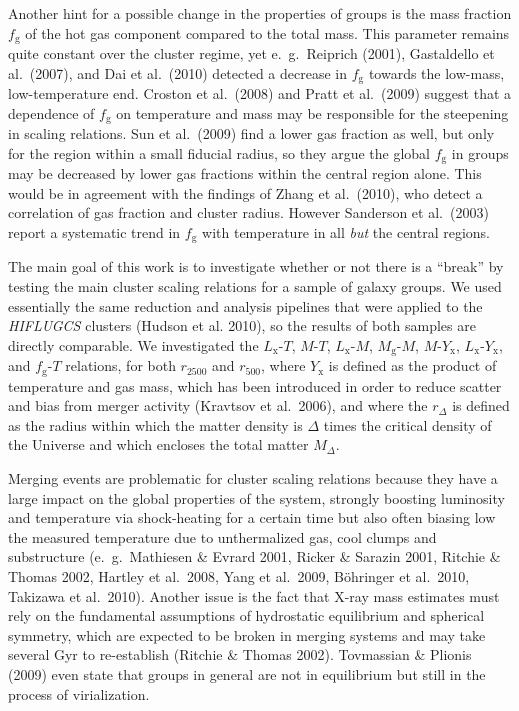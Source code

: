 \documentclass[structabstract]{aa}
\begin{document}
Another hint for a possible change in the properties of groups is the mass
fraction $f_{\text{g}}$ of the hot gas component compared to the total
mass. This parameter remains quite constant over the cluster regime, yet
e.\ g.\ Reiprich (2001), Gastaldello et al.\ (2007), and Dai et al.\ (2010)
detected a decrease in $f_{\text{g}}$ towards the low-mass, low-temperature
end. Croston et al.\ (2008) and Pratt et al.\ (2009) suggest that a dependence
of $f_{\text{g}}$ on temperature and mass may be responsible for the
steepening in scaling relations. Sun et al.\ (2009) find a lower gas fraction
as well, but only for the region within a small fiducial radius, so they argue the global
$f_{\text{g}}$ in groups may be decreased by lower gas fractions within the
central region alone. This would be in agreement with the findings of Zhang et
al.\ (2010), who detect a correlation of gas fraction and cluster
radius. However Sanderson et al.\ (2003) report a systematic trend in
$f_{\text{g}}$ with temperature in all \emph{but} the central regions.

The main goal of this work is to investigate whether or not there is
  a ``break'' by testing the main cluster scaling relations for a
  sample of galaxy groups. We used essentially the same reduction and
analysis pipelines that were applied to the \emph{HIFLUGCS} clusters
(Hudson et al. 2010), so the results of both samples are directly
comparable. We investigated the $L_{\text{x}}$-$T$, $M$-$T$,
$L_{\text{x}}$-$M$, $M_{\text{g}}$-$M$, $M$-$Y_{\text{x}}$,
$L_{\text{x}}$-$Y_{\text{x}}$, and $f_{\text{g}}$-$T$ relations, for
both $r_{2500}$ and $r_{500}$, where $Y_{\text{x}}$ is defined as the
product of temperature and gas mass, which has been introduced in
order to reduce scatter and bias from merger activity (Kravtsov et
al.\ 2006), and where the $r_{\Delta}$ is defined as the radius within
which the matter density is $\Delta$ times the critical density of the
Universe and which encloses the total matter $M_{\Delta}$.

Merging events are problematic for cluster scaling relations because
they have a large impact on the global properties of the system,
strongly boosting luminosity and temperature via shock-heating for a
certain time but also often biasing low the measured temperature due
to unthermalized gas, cool clumps and substructure (e.\ g.\ Mathiesen
\& Evrard 2001, Ricker \& Sarazin 2001, Ritchie \& Thomas 2002,
Hartley et al.\ 2008, Yang et al.\ 2009, B\"ohringer et al.\ 2010,
Takizawa et al.\ 2010). Another issue is the fact that X-ray mass
estimates must rely on the fundamental assumptions of hydrostatic
equilibrium and spherical symmetry, which are expected to be broken in
merging systems and may take several Gyr to re-establish (Ritchie \&
Thomas 2002). Tovmassian \& Plionis (2009) even state that groups in
general are not in equilibrium but still in the process of
virialization.
\end{document}

